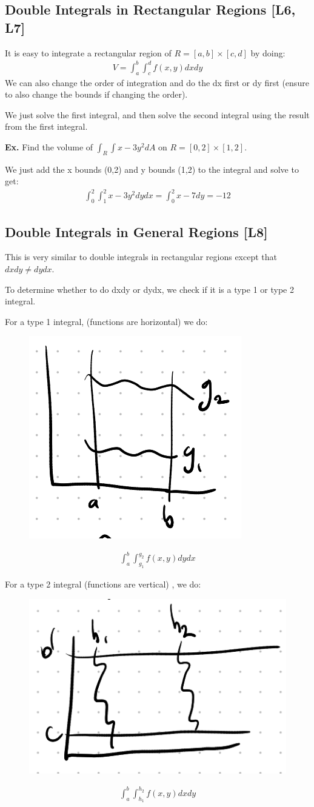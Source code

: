 \documentclass[12pt,letterpaper]{article} \usepackage{amsmath} \usepackage{graphicx} \usepackage[margin=1in]{geometry} \usepackage{longtable}  \usepackage{amssymb}
\begin{document}
	\subsection{Double Integrals in Rectangular Regions [L6, L7]}
	It is easy to integrate a rectangular region of $R = [a,b] \times [c,d]$ by doing:
	\begin{align*}
		V = \int^b_a \int^d_c f(x,y) dxdy
	\end{align*}
	We can also change the order of integration and do the dx first or dy first (ensure to also change the bounds if changing the order).
	
	We just solve the first integral, and then solve the second integral using the result from the first integral.
	\begin{mdframed}[]
		\textbf{Ex. } Find the volume of $\int_R \int x-3y^2 dA$ on $R=[0,2]\times [1,2]$.
		
		We just add the x bounds (0,2) and y bounds (1,2) to the integral and solve to get:
		\begin{align*}
			\int^2_0 \int_1^2 x-3y^2 dydx = \int_0^2 x-7 dy = -12
		\end{align*}
	\end{mdframed}
	
	\subsection{Double Integrals in General Regions [L8]}
	This is very similar to double integrals in rectangular regions except that $dxdy \ne dydx$.
	
	To determine whether to do dxdy or dydx, we check if it is a type 1 or type 2 integral.
	
	For a type 1 integral, (functions are horizontal) we do:
	\begin{figure}[H]
		\centering
		\includegraphics[width=0.3\linewidth]{type1.png}
	\end{figure}
	\begin{align*}
		\int_a^b \int^{g_2}_{g_1} f(x,y) dydx
	\end{align*}

	For a type 2 integral (functions are vertical) , we do:
	\begin{figure}[H]
		\centering
		\includegraphics[width=0.3\linewidth]{type2.png}
	\end{figure}
	\begin{align*}
		\int_a^b \int_{h_1}^{h_2} f(x,y) dxdy
	\end{align*}
	
\end{document}
